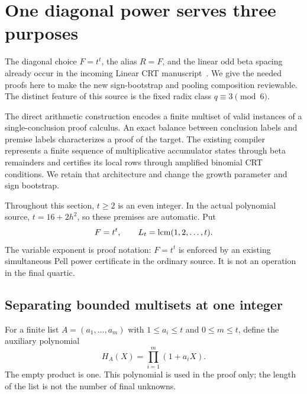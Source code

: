 \section{One diagonal power serves three purposes}\label{sec:diagonal}

The diagonal choice $F=t^t$, the alias $R=F$, and the linear odd beta
spacing already occur in the incoming Linear CRT manuscript~\cite{linearcrt}.
We give the needed proofs here to make the new sign-bootstrap and pooling
composition reviewable. The distinct feature of this source is the fixed
radix class $q\equiv3\pmod6$.

The direct arithmetic construction encodes a finite multiset of valid
instances of a single-conclusion proof calculus. An exact balance between
conclusion labels and premise labels characterizes a proof of the target.
The existing compiler represents a finite sequence of multiplicative
accumulator states through beta remainders and certifies its local rows
through amplified binomial CRT conditions. We retain that architecture
and change the growth parameter and sign bootstrap.

Throughout this section, $t\ge2$ is an even integer. In the actual
polynomial source, $t=16+2h^2$, so these premises are automatic. Put
\[
 F=t^t,\qquad L_t=\operatorname{lcm}(1,2,\ldots,t).
\]
The variable exponent is proof notation: $F=t^t$ is enforced by an
existing simultaneous Pell power certificate in the ordinary source.
It is not an operation in the final quartic.

\subsection{Separating bounded multisets at one integer}

For a finite list $A=(a_1,\ldots,a_m)$ with $1\le a_i\le t$ and
$0\le m\le t$, define the auxiliary polynomial
\[
 H_A(X)=\prod_{i=1}^{m}(1+a_iX).
\]
The empty product is one. This polynomial is used in the proof only;
the length of the list is not the number of final unknowns.

